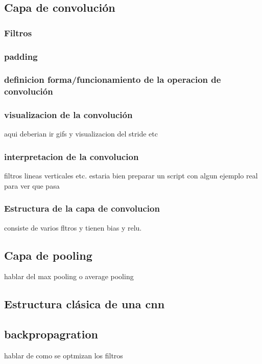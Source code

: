\documentclass{article}
\begin{document}
\subsection{Capa de convolución}

\subsubsection{Filtros}

\subsubsection{padding}

\subsubsection{definicion forma/funcionamiento de la operacion de convolución}

\subsubsection{visualizacion de la convolución}
aqui deberian ir gifs y visualizacion del stride etc

\subsubsection{interpretacion de la convolucion}
filtros lineas verticales etc. estaria bien preparar un script con algun ejemplo real para ver que pasa

\subsubsection{Estructura de la capa de convolucion}

consiste de varios fltros y tienen bias y relu. 


\subsection{Capa de pooling}
hablar del max pooling o average pooling

\subsection{Estructura clásica de una cnn}

\subsection{backpropagration}
hablar de como se optmizan los filtros
\end{document}
